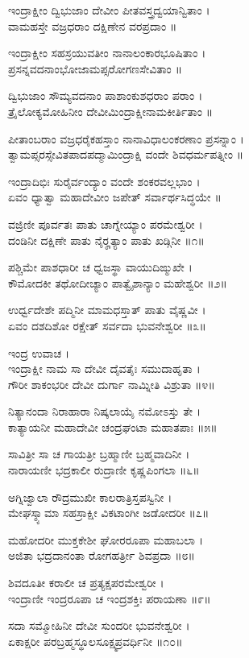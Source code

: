ಇಂದ್ರಾಕ್ಷೀಂ ದ್ವಿಭುಜಾಂ ದೇವೀಂ ಪೀತವಸ್ತ್ರದ್ವಯಾನ್ವಿತಾಂ ।\\
ವಾಮಹಸ್ತೇ ವಜ್ರಧರಾಂ ದಕ್ಷಿಣೇನ ವರಪ್ರದಾಂ ॥

ಇಂದ್ರಾಕ್ಷೀಂ ಸಹಸ್ರಯುವತೀಂ ನಾನಾಲಂಕಾರಭೂಷಿತಾಂ ।\\
ಪ್ರಸನ್ನವದನಾಂಭೋಜಾಮಪ್ಸರೋಗಣಸೇವಿತಾಂ ॥

ದ್ವಿಭುಜಾಂ ಸೌಮ್ಯವದನಾಂ ಪಾಶಾಂಕುಶಧರಾಂ ಪರಾಂ ।\\
ತ್ರೈಲೋಕ್ಯಮೋಹಿನೀಂ ದೇವೀಮಿಂದ್ರಾಕ್ಷೀನಾಮಕೀರ್ತಿತಾಂ ॥

ಪೀತಾಂಬರಾಂ ವಜ್ರಧರೈಕಹಸ್ತಾಂ ನಾನಾವಿಧಾಲಂಕರಣಾಂ ಪ್ರಸನ್ನಾಂ ।\\
ತ್ವಾಮಪ್ಸರಸ್ಸೇವಿತಪಾದಪದ್ಮಾಮಿಂದ್ರಾಕ್ಷಿ ವಂದೇ ಶಿವಧರ್ಮಪತ್ನೀಂ ॥

ಇಂದ್ರಾದಿಭಿಃ ಸುರೈರ್ವಂದ್ಯಾಂ ವಂದೇ ಶಂಕರವಲ್ಲಭಾಂ ।\\
ಏವಂ ಧ್ಯಾತ್ವಾ ಮಹಾದೇವೀಂ ಜಪೇತ್ ಸರ್ವಾರ್ಥಸಿದ್ಧಯೇ ॥

ವಜ್ರಿಣೀ ಪೂರ್ವತಃ ಪಾತು ಚಾಗ್ನೇಯ್ಯಾಂ ಪರಮೇಶ್ವರೀ ।\\
ದಂಡಿನೀ ದಕ್ಷಿಣೇ ಪಾತು ನೈರೄತ್ಯಾಂ ಪಾತು ಖಡ್ಗಿನೀ ॥೧॥

ಪಶ್ಚಿಮೇ ಪಾಶಧಾರೀ ಚ ಧ್ವಜಸ್ಥಾ ವಾಯುದಿಙ್ಮುಖೇ ।\\
ಕೌಮೋದಕೀ ತಥೋದೀಚ್ಯಾಂ ಪಾತ್ವೈಶಾನ್ಯಾಂ ಮಹೇಶ್ವರೀ ॥೨॥

ಉರ್ಧ್ವದೇಶೇ ಪದ್ಮಿನೀ ಮಾಮಧಸ್ತಾತ್ ಪಾತು ವೈಷ್ಣವೀ ।\\
ಏವಂ ದಶದಿಶೋ ರಕ್ಷೇತ್ ಸರ್ವದಾ ಭುವನೇಶ್ವರೀ ॥೩॥

ಇಂದ್ರ ಉವಾಚ ।\\
ಇಂದ್ರಾಕ್ಷೀ ನಾಮ ಸಾ ದೇವೀ ದೈವತೈಃ ಸಮುದಾಹೃತಾ ।\\
ಗೌರೀ ಶಾಕಂಭರೀ ದೇವೀ ದುರ್ಗಾ ನಾಮ್ನೀತಿ ವಿಶ್ರುತಾ ॥೪॥

ನಿತ್ಯಾನಂದಾ ನಿರಾಹಾರಾ ನಿಷ್ಕಲಾಯೈ ನಮೋಽಸ್ತು ತೇ ।\\
ಕಾತ್ಯಾಯನೀ ಮಹಾದೇವೀ ಚಂದ್ರಘಂಟಾ ಮಹಾತಪಾಃ ॥೫॥

ಸಾವಿತ್ರೀ ಸಾ ಚ ಗಾಯತ್ರೀ ಬ್ರಹ್ಮಾಣೀ ಬ್ರಹ್ಮವಾದಿನೀ ।\\
ನಾರಾಯಣೀ ಭದ್ರಕಾಲೀ ರುದ್ರಾಣೀ ಕೃಷ್ಣಪಿಂಗಲಾ ॥೬॥

ಅಗ್ನಿಜ್ವಾಲಾ ರೌದ್ರಮುಖೀ ಕಾಲರಾತ್ರಿಸ್ತಪಸ್ವಿನೀ ।\\
ಮೇಘಸ್ಶ್ಯಾಮಾ ಸಹಸ್ರಾಕ್ಷೀ ವಿಕಟಾಂಗೀ ಜಡೋದರೀ ॥೭॥

ಮಹೋದರೀ ಮುಕ್ತಕೇಶೀ ಘೋರರೂಪಾ ಮಹಾಬಲಾ ।\\
ಅಜಿತಾ ಭದ್ರದಾನಂತಾ ರೋಗಹರ್ತ್ರೀ ಶಿವಪ್ರದಾ ॥೮॥

ಶಿವದೂತೀ ಕರಾಲೀ ಚ ಪ್ರತ್ಯಕ್ಷಪರಮೇಶ್ವರೀ ।\\
ಇಂದ್ರಾಣೀ ಇಂದ್ರರೂಪಾ ಚ ಇಂದ್ರಶಕ್ತಿಃ ಪರಾಯಣಾ ॥೯॥

ಸದಾ ಸಮ್ಮೋಹಿನೀ ದೇವೀ ಸುಂದರೀ ಭುವನೇಶ್ವರೀ ।\\
ಏಕಾಕ್ಷರೀ ಪರಬ್ರಹ್ಮಸ್ಥೂಲಸೂಕ್ಷ್ಮಪ್ರವರ್ಧಿನೀ ॥೧೦॥

